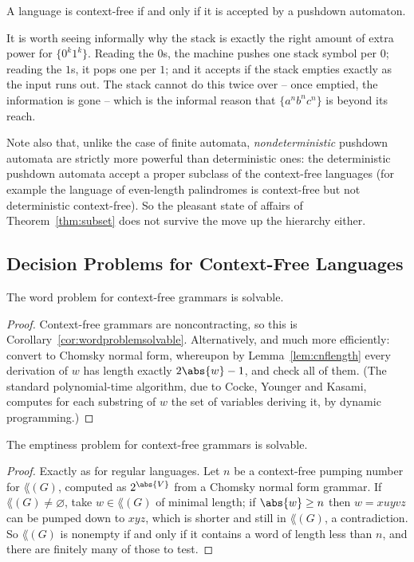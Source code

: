 \begin{theorem}
	A language is context-free if and only if it is accepted by a pushdown automaton.
\end{theorem}

It is worth seeing informally why the stack is exactly the right amount of extra power for $\{0^k1^k\}$. Reading the $0$s, the machine pushes one stack symbol per $0$; reading the $1$s, it pops one per $1$; and it accepts if the stack empties exactly as the input runs out. The stack cannot do this twice over -- once emptied, the information is gone -- which is the informal reason that $\{a^nb^nc^n\}$ is beyond its reach.

Note also that, unlike the case of finite automata, \emph{nondeterministic} pushdown automata are strictly more powerful than deterministic ones: the deterministic pushdown automata accept a proper subclass of the context-free languages (for example the language of even-length palindromes is context-free but not deterministic context-free). So the pleasant state of affairs of Theorem~\ref{thm:subset} does not survive the move up the hierarchy either.

\subsection{Decision Problems for Context-Free Languages}

\begin{proposition}
	The word problem for context-free grammars is solvable.
\end{proposition}

\begin{proof}
	Context-free grammars are noncontracting, so this is Corollary~\ref{cor:wordproblemsolvable}. Alternatively, and much more efficiently: convert to Chomsky normal form, whereupon by Lemma~\ref{lem:cnflength} every derivation of $w$ has length exactly $2\abs{w}-1$, and check all of them. (The standard polynomial-time algorithm, due to Cocke, Younger and Kasami, computes for each substring of $w$ the set of variables deriving it, by dynamic programming.)
\end{proof}

\begin{proposition}
	The emptiness problem for context-free grammars is solvable.
\end{proposition}

\begin{proof}
	Exactly as for regular languages. Let $n$ be a context-free pumping number for $\lang(G)$, computed as $2^{\abs{V}}$ from a Chomsky normal form grammar. If $\lang(G) \neq \varnothing$, take $w \in \lang(G)$ of minimal length; if $\abs{w} \geq n$ then $w = xuyvz$ can be pumped down to $xyz$, which is shorter and still in $\lang(G)$, a contradiction. So $\lang(G)$ is nonempty if and only if it contains a word of length less than $n$, and there are finitely many of those to test.
\end{proof}

